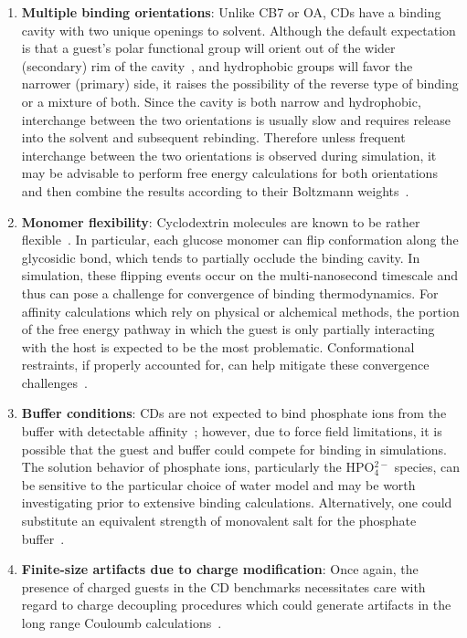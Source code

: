\documentclass[aps,pre,twocolumn,nofootinbib,superscriptaddress,10pt, final,tightenlines]{revtex4-1}
\begin{document}
\begin{enumerate}
\item{{\bf Multiple binding orientations}: Unlike CB7 or OA, CDs have a binding cavity with two unique openings to solvent. 
Although the default expectation is that a guest's polar functional group will orient out of the wider (secondary) rim of the cavity~\cite{rekharsky_thermodynamic_1997, rekharsky_complexation_1998}, and hydrophobic groups will favor the narrower (primary) side, it raises the possibility of the reverse type of binding or a mixture of both. 
Since the cavity is both narrow and hydrophobic, interchange between the two orientations is usually slow and requires release into the solvent and subsequent rebinding. 
Therefore unless frequent interchange between the two orientations is observed during simulation, it may be advisable to perform free energy calculations for both orientations and then combine the results according to their Boltzmann weights~\cite{henriksen_computational_2015}.}

\item{{\bf Monomer flexibility}: Cyclodextrin molecules are known to be rather flexible~\cite{bell_new_1997, Connors:1997:Chem.Rev.}. 
In particular, each glucose monomer can flip conformation along the glycosidic bond, which tends to partially occlude the binding cavity. 
In simulation, these flipping events occur on the multi-nanosecond timescale and thus can pose a challenge for convergence of binding thermodynamics. 
For affinity calculations which rely on physical or alchemical methods, the portion of the free energy pathway in which the guest is only partially interacting with the host is expected to be the most problematic.
Conformational restraints, if properly accounted for, can help mitigate these convergence challenges~\cite{henriksen_computational_2015}.}

\item{{\bf Buffer conditions}: CDs are not expected to bind phosphate ions from the buffer with detectable affinity~\cite{rekharsky_thermodynamic_1995, rekharsky_complexation_1998}; however, due to force field limitations, it is possible that the guest and buffer could compete for binding in simulations. 
The solution behavior of phosphate ions, particularly the HPO$_4^{2-}$ species, can be sensitive to the particular choice of water model and may be worth investigating prior to extensive binding calculations. 
Alternatively, one could substitute an equivalent strength of monovalent salt for the phosphate buffer~\cite{henriksen_evaluating_2017}. }

\item{{\bf Finite-size artifacts due to charge modification}: Once again, the presence of charged guests in the CD benchmarks necessitates care with regard to charge decoupling procedures which could generate artifacts in the long range Couloumb calculations~\cite{rocklin_calculating_2013, lin_overview_2014, reif_net_2014, simonson_concepts_2016}. }
\end{enumerate}
\end{document}

